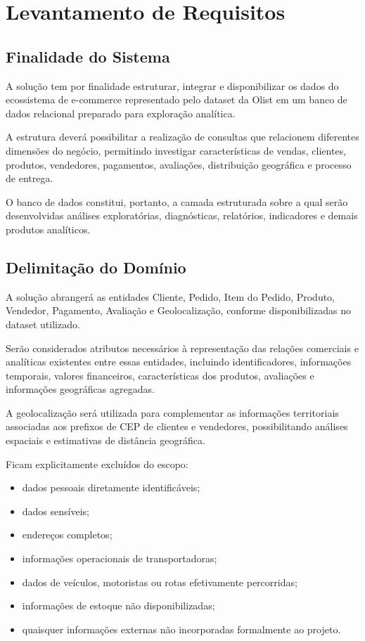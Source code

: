 \documentclass[12pt,a4paper]{article}
\begin{document}
\section{Levantamento de Requisitos}

\subsection{Finalidade do Sistema}

A solução tem por finalidade estruturar, integrar e disponibilizar os dados do ecossistema de e-commerce representado pelo dataset da Olist em um banco de dados relacional preparado para exploração analítica.

A estrutura deverá possibilitar a realização de consultas que relacionem diferentes dimensões do negócio, permitindo investigar características de vendas, clientes, produtos, vendedores, pagamentos, avaliações, distribuição geográfica e processo de entrega.

O banco de dados constitui, portanto, a camada estruturada sobre a qual serão desenvolvidas análises exploratórias, diagnósticas, relatórios, indicadores e demais produtos analíticos.

\subsection{Delimitação do Domínio}

A solução abrangerá as entidades Cliente, Pedido, Item do Pedido, Produto, Vendedor, Pagamento, Avaliação e Geolocalização, conforme disponibilizadas no dataset utilizado.

Serão considerados atributos necessários à representação das relações comerciais e analíticas existentes entre essas entidades, incluindo identificadores, informações temporais, valores financeiros, características dos produtos, avaliações e informações geográficas agregadas.

A geolocalização será utilizada para complementar as informações territoriais associadas aos prefixos de CEP de clientes e vendedores, possibilitando análises espaciais e estimativas de distância geográfica.

Ficam explicitamente excluídos do escopo:

\begin{itemize}
    \item dados pessoais diretamente identificáveis;
    \item dados sensíveis;
    \item endereços completos;
    \item informações operacionais de transportadoras;
    \item dados de veículos, motoristas ou rotas efetivamente percorridas;
    \item informações de estoque não disponibilizadas;
    \item quaisquer informações externas não incorporadas formalmente ao projeto.
\end{itemize}
\end{document}
